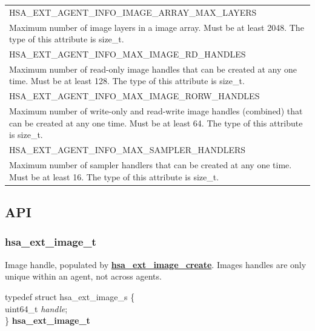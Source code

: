 \documentclass[final,oneside]{book}
\newcommand{\reffun}[1]{\textbf{#1}}
\newcommand{\reffld}[1]{\textit{#1}}
\newcommand{\reftyp}[1]{#1}
\newcommand{\refenu}[1]{\reftyp{#1}}
\newenvironment{mylongtable}{\rowcolors{0}{lightgray}{lightgray}\longtable} {
\endlongtable}
\begin{document}
\begin{longtable}{@{\hspace{2em}}p{\linewidth-2em}}
\hspace{-2em}\refenu{HSA_\-EXT_\-AGENT_\-INFO_\-IMAGE_\-ARRAY_\-MAX_\-LAYERS}\\Maximum number of image layers in a image array. Must be at least 2048. The type of this attribute is size_\-t.\\[2mm]
\hspace{-2em}\refenu{HSA_\-EXT_\-AGENT_\-INFO_\-MAX_\-IMAGE_\-RD_\-HANDLES}\\Maximum number of read-only image handles that can be created at any one time. Must be at least 128. The type of this attribute is size_\-t.\\[2mm]
\hspace{-2em}\refenu{HSA_\-EXT_\-AGENT_\-INFO_\-MAX_\-IMAGE_\-RORW_\-HANDLES}\\Maximum number of write-only and read-write image handles (combined) that can be created at any one time. Must be at least 64. The type of this attribute is size_\-t.\\[2mm]
\hspace{-2em}\refenu{HSA_\-EXT_\-AGENT_\-INFO_\-MAX_\-SAMPLER_\-HANDLERS}\\Maximum number of sampler handlers that can be created at any one time. Must be at least 16. The type of this attribute is size_\-t.
\end{longtable} 

\subsection{API}
\makeatletter{}

\subsubsection{hsa_\-ext_\-image_\-t}
\vspace{-2.5mm}Image handle, populated by \hyperlink{group__ext-images_1ga985562c68508d4d8b0edcfd0729b6d49}{\reffun{hsa_\-ext_\-image_\-create}}. Images handles are only unique within an agent, not across agents.\begin{mylongtable}{@{}p{\textwidth}}
\rule{0pt}{3ex}typedef struct  hsa_ext_image_s \{\\
\hspace{1.7em}uint64_\-t \reffld{handle};\\
\}  \hypertarget{group__ext-images_1ga9a7aa8bcef63b675bfe2fccf63925455}{\textbf{hsa_\-ext_\-image_\-t}}\rule[-2ex]{0pt}{0pt}
\end{mylongtable}
\end{document}
